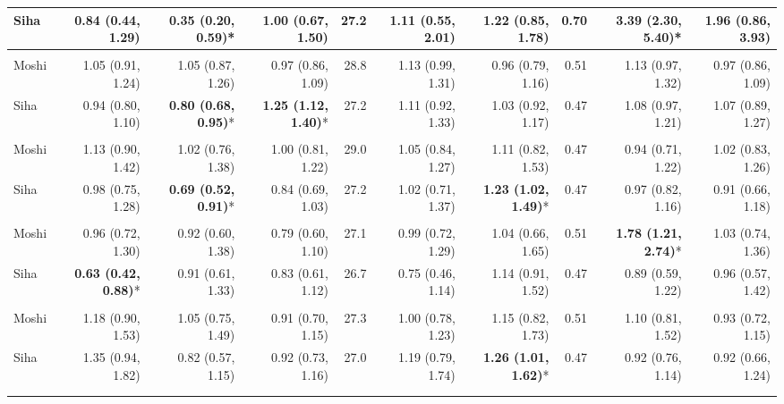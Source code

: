 \begin{table}[t]
\begin{tabular*}{\linewidth}{@{\extracolsep{\fill}}l|rrrrrrrrr}
Siha & 0.84 (0.44, 1.29) & \textbf{0.35 (0.20, 0.59)}* & 1.00 (0.67, 1.50) & 27.2 & 1.11 (0.55, 2.01) & 1.22 (0.85, 1.78) & 0.70 & \textbf{3.39 (2.30, 5.40)}* & 1.96 (0.86, 3.93) \\ 
\midrule\addlinespace[2.5pt]
\multicolumn{10}{l}{Peptic Ulcers} \\[2.5pt] 
\midrule\addlinespace[2.5pt]
Moshi & 1.05 (0.91, 1.24) & 1.05 (0.87, 1.26) & 0.97 (0.86, 1.09) & 28.8 & 1.13 (0.99, 1.31) & 0.96 (0.79, 1.16) & 0.51 & 1.13 (0.97, 1.32) & 0.97 (0.86, 1.09) \\ 
Siha & 0.94 (0.80, 1.10) & \textbf{0.80 (0.68, 0.95)}* & \textbf{1.25 (1.12, 1.40)}* & 27.2 & 1.11 (0.92, 1.33) & 1.03 (0.92, 1.17) & 0.47 & 1.08 (0.97, 1.21) & 1.07 (0.89, 1.27) \\ 
\midrule\addlinespace[2.5pt]
\multicolumn{10}{l}{Epilepsy} \\[2.5pt] 
\midrule\addlinespace[2.5pt]
Moshi & 1.13 (0.90, 1.42) & 1.02 (0.76, 1.38) & 1.00 (0.81, 1.22) & 29.0 & 1.05 (0.84, 1.27) & 1.11 (0.82, 1.53) & 0.47 & 0.94 (0.71, 1.22) & 1.02 (0.83, 1.26) \\ 
Siha & 0.98 (0.75, 1.28) & \textbf{0.69 (0.52, 0.91)}* & 0.84 (0.69, 1.03) & 27.2 & 1.02 (0.71, 1.37) & \textbf{1.23 (1.02, 1.49)}* & 0.47 & 0.97 (0.82, 1.16) & 0.91 (0.66, 1.18) \\ 
\midrule\addlinespace[2.5pt]
\multicolumn{10}{l}{Neuroses} \\[2.5pt] 
\midrule\addlinespace[2.5pt]
Moshi & 0.96 (0.72, 1.30) & 0.92 (0.60, 1.38) & 0.79 (0.60, 1.10) & 27.1 & 0.99 (0.72, 1.29) & 1.04 (0.66, 1.65) & 0.51 & \textbf{1.78 (1.21, 2.74)}* & 1.03 (0.74, 1.36) \\ 
Siha & \textbf{0.63 (0.42, 0.88)}* & 0.91 (0.61, 1.33) & 0.83 (0.61, 1.12) & 26.7 & 0.75 (0.46, 1.14) & 1.14 (0.91, 1.52) & 0.47 & 0.89 (0.59, 1.22) & 0.96 (0.57, 1.42) \\ 
\midrule\addlinespace[2.5pt]
\multicolumn{10}{l}{Psychoses} \\[2.5pt] 
\midrule\addlinespace[2.5pt]
Moshi & 1.18 (0.90, 1.53) & 1.05 (0.75, 1.49) & 0.91 (0.70, 1.15) & 27.3 & 1.00 (0.78, 1.23) & 1.15 (0.82, 1.73) & 0.51 & 1.10 (0.81, 1.52) & 0.93 (0.72, 1.15) \\ 
Siha & 1.35 (0.94, 1.82) & 0.82 (0.57, 1.15) & 0.92 (0.73, 1.16) & 27.0 & 1.19 (0.79, 1.74) & \textbf{1.26 (1.01, 1.62)}* & 0.47 & 0.92 (0.76, 1.14) & 0.92 (0.66, 1.24) \\ 
\midrule\addlinespace[2.5pt]
\multicolumn{10}{l}{Dysentery} \\[2.5pt] 
\midrule\addlinespace[2.5pt]

\end{tabular*}
\end{table}
